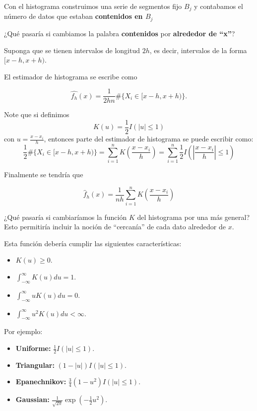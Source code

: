 \documentclass[
  12pt,
]{book}
\providecommand{\tightlist}{%
  \setlength{\itemsep}{0pt}\setlength{\parskip}{0pt}}
\begin{document}
Con el histograma construimos una serie de segmentos fijo \(B_{j}\) y
contabamos el número de datos que estaban \textbf{contenidos en
\(B_{j}\)}

¿Qué pasaría si cambiamos la palabra \textbf{contenidos} por
\textbf{alrededor de ``x''}?

Suponga que se tienen intervalos de longitud \(2h\), es decir,
intervalos de la forma \([x-h,x+h)\).

El estimador de histograma se escribe como

\begin{equation*}
\hat{f_{h}}(x) = \dfrac{1}{2hn} \# \{ X_i \in [x-h,x+h) \}.
\end{equation*}

Note que si definimos \begin{equation*}
K(u)=\frac{1}{2} I \left( \left\vert u \right\vert \leq 1 \right)
\end{equation*} con \(u = \frac{x-x_i}{h}\), entonces parte del
estimador de histograma se puede escribir como: \begin{equation*}
\frac{1}{2}\# \{ X_i \in [x-h,x+h) \}
=\sum_{i=1}^{n} K\left( \frac{x-x_{i}}{h} \right)
=\sum_{i=1}^{n}  \frac{1}{2} I \left( \left\vert \frac{x-x_{i}}{h}
\right\vert \leq 1 \right)
\end{equation*}

Finalmente se tendría que

\begin{equation*}
\hat{f}_{h}\left( x \right) = \frac{1}{nh}\sum_{i=1}^{n} K\left( \frac{x-x_{i}}{h} \right)
\end{equation*}

¿Qué pasaría si cambiaríamos la función \(K\) del histograma por una más
general? Esto permitiría incluir la noción de ``cercanía'' de cada dato
alrededor de \(x\).

Esta función debería cumplir las siguientes características:

\begin{itemize}
\tightlist
\item
  \(K(u)\geq 0\).
\item
  \(\int_{-\infty}^{\infty} K(u)du = 1\).
\item
  \(\int_{-\infty}^{\infty} u K(u)du = 0\).
\item
  \(\int_{-\infty}^{\infty} u^{2} K(u)du <\infty\).
\end{itemize}

Por ejemplo:

\begin{itemize}
\tightlist
\item
  \textbf{Uniforme:}
  \(\frac{1}{2} I \left( \left\vert u \right\vert \leq 1 \right)\).
\item
  \textbf{Triangular:}
  \((1-|u|) I \left( \left\vert u \right\vert \leq 1 \right)\).
\item
  \textbf{Epanechnikov:}
  \(\frac{3}{4} (1-u^{2}) I \left( \left\vert u \right\vert \leq 1 \right)\).
\item
  \textbf{Gaussian:}
  \(\frac{1}{\sqrt{2\pi}} \exp \left( -\frac{1}{2}u^{2} \right)\).
\end{itemize}
\end{document}
